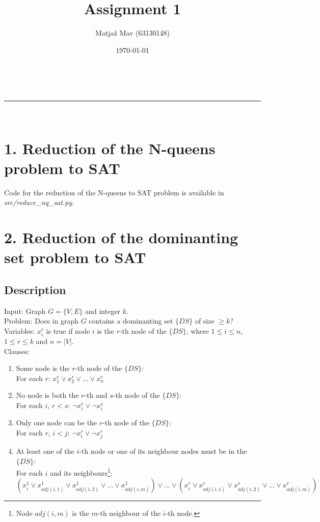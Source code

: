\documentclass[a4paper,11pt]{article}
\makeatletter
\newcommand{\linia}{\rule{\linewidth}{0.5pt}}
\theoremstyle{mytheor}
\renewcommand{\maketitle}{
\begin{center}
\vspace{2ex}
{\huge \textsc{\@title}}
\vspace{1ex}
\\
\linia\\
\@author \hfill \@date
\vspace{4ex}
\end{center}
}
\makeatother
\begin{document}
\title{Assignment 1}

\author{Matjaž Mav (63130148)}

\date{\today}

\maketitle

\section*{1. Reduction of the N-queens problem to SAT}
Code for the reduction of the N-queens to SAT problem is available in \textit{src/reduce\_nq\_sat.py}.

\section*{2. Reduction of the dominanting set problem to SAT}

\subsection*{Description}

Input: Graph $G = \{V, E\}$ and integer $k$.\\
Problem: Does in graph $G$ contains a dominanting set $\{DS\}$ of size $\geq k$?\\
Variables: $x_i^r$ is true if node $i$ is the $r$-th node of the $\{DS\}$, where $1 \leq i \leq n$, $1 \leq r \leq k$ and $n = |V|$.\\
Clauses:
\begin{enumerate}
  \item Some node is the $r$-th node of the $\{DS\}$:\\
        For each $r$: $x_1^r \lor x_2^r \lor ... \lor x_n^r$
  \item No node is both the $r$-th and $s$-th node of the $\{DS\}$:\\
        For each $i$, $r<s$: $\neg x_i^r \lor \neg x_i^s$
  \item Only one node can be the $r$-th node of the $\{DS\}$:\\
        For each $r$, $i<j$: $\neg x_i^r \lor \neg x_j^r$
  \item At least one of the $i$-th node or one of its neighbour nodes must be in the $\{DS\}$:\\
        For each $i$ and its neighbours\footnote{Node $adj(i, m)$ is the $m$-th neighbour of the $i$-th node.}: $(x_i^1 \lor x_{adj(i, 1)}^1 \lor x_{adj(i, 2)}^1 \lor ... \lor x_{adj(i, m)}^1) \lor ... \lor (x_i^r \lor x_{adj(i, 1)}^r \lor x_{adj(i, 2)}^r \lor ... \lor x_{adj(i, m)}^r)$
\end{enumerate}
\end{document}
